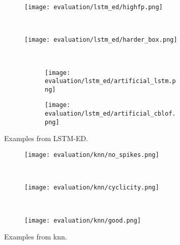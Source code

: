 \begin{figure}[htp!]
    \begin{subfigure}[b]{\linewidth}
        \centering
        \texttt{[image: evaluation/lstm\_ed/highfp.png]}
        \label{fig:lstmed-fp}
    \end{subfigure}%
    \\
    \begin{subfigure}[b]{\linewidth}
        \centering
        \texttt{[image: evaluation/lstm\_ed/harder\_box.png]}
        \label{fig:lstmed-harder}
    \end{subfigure}
    \\
    \begin{subfigure}[b]{\linewidth}
        \begin{subfigure}[b]{.45\linewidth}
            \centering
            \texttt{[image: evaluation/lstm\_ed/artificial\_lstm.png]}
        \end{subfigure}
        \hfill
        \begin{subfigure}[b]{.45\linewidth}
            \centering
            \texttt{[image: evaluation/lstm\_ed/artificial\_cblof.png]}
        \end{subfigure}
        \label{fig:lstmed-artificial}
    \end{subfigure}
\caption{Examples from LSTM-ED.}\label{fig:lstmed-output}
\end{figure}

\begin{figure}[htp!]
    \begin{subfigure}[b]{\linewidth}
        \centering
        \texttt{[image: evaluation/knn/no\_spikes.png]}
        \label{fig:spike-missed}
    \end{subfigure}
    \\
    \begin{subfigure}[b]{\linewidth}
        \centering
        \texttt{[image: evaluation/knn/cyclicity.png]}
        \label{fig:knn-cyclicity}
    \end{subfigure}%
    \\
    \begin{subfigure}[b]{\linewidth}
        \centering
        \texttt{[image: evaluation/knn/good.png]}
        \label{fig:knn-harder}
    \end{subfigure}
\caption{Examples from \gls{knn}.}\label{fig:knn-output}
\end{figure}


